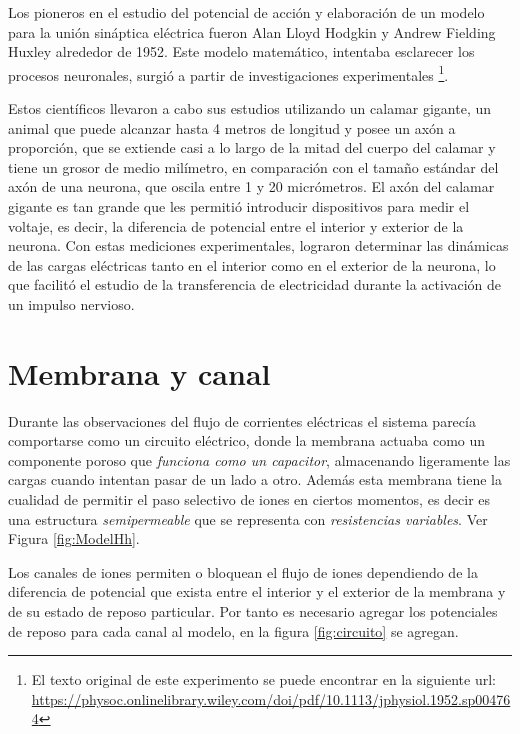 Los pioneros en el estudio del potencial de acción y elaboración de un modelo para la unión sináptica eléctrica fueron Alan Lloyd Hodgkin y Andrew Fielding Huxley alrededor de 1952. Este modelo matemático, intentaba esclarecer los procesos neuronales, surgió a partir de investigaciones experimentales  \footnote{El texto original de este experimento se puede encontrar en la siguiente url: \url{ https://physoc.onlinelibrary.wiley.com/doi/pdf/10.1113/jphysiol.1952.sp004764}}.

Estos científicos llevaron a cabo sus estudios utilizando un calamar gigante, un animal que puede alcanzar hasta 4 metros de longitud y posee un axón a proporción, que se extiende casi a lo largo de la mitad del cuerpo del calamar y tiene un grosor de medio milímetro, en comparación con el tamaño estándar del axón de una neurona, que oscila entre 1 y 20 micrómetros. 
El axón del calamar gigante es tan grande que les permitió introducir dispositivos para medir el voltaje, es decir, la diferencia de potencial entre el interior y exterior de la neurona. Con estas mediciones experimentales, lograron determinar las dinámicas de las cargas eléctricas tanto en el interior como en el exterior de la neurona, lo que facilitó el estudio de la transferencia de electricidad durante la activación de un impulso nervioso.
 

\section{Membrana y canal}

Durante las observaciones del flujo de corrientes eléctricas el sistema parecía comportarse como un circuito eléctrico, donde la membrana actuaba como un componente poroso que \textit{funciona como un capacitor}, almacenando ligeramente las cargas cuando intentan pasar de un lado a otro. Además esta membrana tiene la cualidad de permitir el paso selectivo de iones en ciertos momentos, es decir es una estructura \textit{semipermeable} que se representa con \textit{resistencias variables}. Ver Figura \ref{fig:ModelHh}.

Los canales de iones permiten o bloquean el flujo de iones dependiendo de la diferencia de potencial que exista entre el interior y el exterior de la membrana y de su estado de reposo particular. Por tanto es necesario agregar los potenciales de reposo para cada canal al modelo, en la figura \ref{fig:circuito} se agregan.


